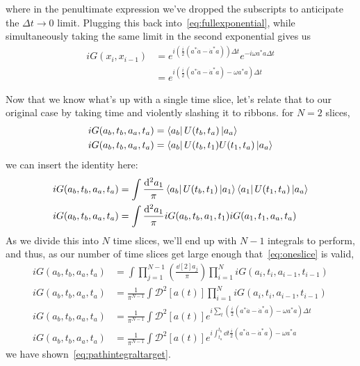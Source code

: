 \documentclass{article}
\newcommand{\msr}{\mathcal{D}}
\begin{document}
	where in the penultimate expression we've dropped the subscripts to anticipate the $\Delta t \rightarrow 0$ limit.
	Plugging this back into~\eqref{eq:fullexponential}, while simultaneously taking the same limit in the second exponential gives us
	\begin{align}
		i G(x_i, x_{i-1}) &= e^{i \left( \frac{i}{2} \left( a^\ast \dot{a} -  \dot{a}^\ast  a \right) \right) \Delta t}  e^{-i \omega a^\ast a \Delta t} \\
		&= e^{i \left( \frac{i}{2} \left( a^\ast \dot{a} -  \dot{a}^\ast  a \right) - \omega a^\ast a \right) \Delta t} \label{eq:oneslice}
	\end{align}

	Now that we know what's up with a single time slice, let's relate that to our original case by taking time and violently slashing it to ribbons.
	\triv for $N = 2$ slices,
	\begin{align}
		i G(a_b, t_b, a_a, t_a) &= \bra{a_b} U(t_b, t_a) \ket{a_a} \\
		i G(a_b, t_b, a_a, t_a) &= \bra{a_b} U(t_b, t_1) U(t_1, t_a) \ket{a_a}
	\end{align}
	\triv we can insert the identity here:
	\begin{align}
		i G(a_b, t_b, a_a, t_a) &= \int \frac{\dd[2]{a_1}}{\pi} \bra{a_b} U(t_b, t_1) \ket{a_1} \bra{a_1} U(t_1, t_a) \ket{a_a} \\
		i G(a_b, t_b, a_a, t_a) &= \int \frac{\dd[2]{a_1}}{\pi} i G(a_b, t_b, a_1, t_1)  i G(a_1, t_1, a_a, t_a)
	\end{align}
	As we divide this into $N$ time slices, we'll end up with $N - 1$ integrals to perform, and thus, as our number of time slices get large enough that~\eqref{eq:oneslice} is valid,
	\begin{align}
		i G(a_b, t_b, a_a, t_a) &= \int \prod_{j = 1}^{N - 1} \left( \frac{\dd[2]{a_j}}{\pi}\right)  \prod_{i=1}^{N} i G(a_i, t_i, a_{i-1}, t_{i-1}) \\
		i G(a_b, t_b, a_a, t_a) &= \frac{1}{\pi^{N - 1}} \int \msr^2[a(t)] \prod_{i=1}^{N} i G(a_i, t_i, a_{i-1}, t_{i-1}) \\
		i G(a_b, t_b, a_a, t_a) &= \frac{1}{\pi^{N - 1}} \int \msr^2[a(t)] e^{i \sum_t \left( \frac{i}{2} \left( a^\ast \dot{a} -  \dot{a}^\ast  a \right) - \omega a^\ast a \right) \Delta t} \\
		i G(a_b, t_b, a_a, t_a) &= \frac{1}{\pi^{N - 1}} \int \msr^2[a(t)] e^{i \int_{t_a}^{t_b} \dd{t} \frac{i}{2} \left( a^\ast \dot{a} -  \dot{a}^\ast  a \right) - \omega a^\ast a}
	\end{align}
	\thrf we have shown~\eqref{eq:pathintegraltarget}.
\end{document}

